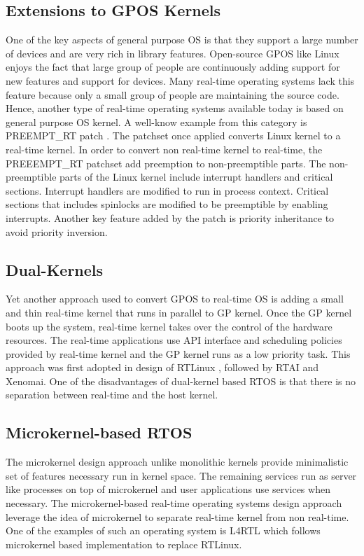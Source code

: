 \subsection{Extensions to GPOS Kernels} \label{sec:rtos-ext-gpos}
One of the key aspects of general purpose OS is that they support a large number of devices and are very rich in library features. 
Open-source GPOS like Linux enjoys the fact that large group of people are continuously adding support for new features and support for devices.
Many real-time operating systems lack this feature because only a small group of people are maintaining the source code. 
Hence, another type of real-time operating systems available today is based on general purpose OS kernel.
A well-know example from this category is PREEMPT\_RT patch \cite{PREEMPT-RT}. 
The patchset once applied converts Linux kernel to a real-time kernel.
In order to convert non real-time kernel to real-time, the PREEEMPT\_RT patchset add preemption to non-preemptible parts.
The non-preemptible parts of the Linux kernel include interrupt handlers and critical sections.
Interrupt handlers are modified to run in process context. 
Critical sections that includes spinlocks are modified to be preemptible by enabling interrupts.
Another key feature added by the patch is priority inheritance to avoid priority inversion.  

\subsection{Dual-Kernels}
Yet another approach used to convert GPOS to real-time OS is adding a small and thin real-time kernel that runs in parallel to GP kernel.
Once the GP kernel boots up the system, real-time kernel takes over the control of the hardware resources.
The real-time applications use API interface and scheduling policies provided by real-time kernel and the GP kernel runs as a low priority task.
This approach was first adopted in design of RTLinux \cite{yodaiken1999rtlinux}, followed by RTAI \cite{RTAI} and Xenomai\cite{Xenomai}. 
One of the disadvantages of dual-kernel based RTOS is that there is no separation between real-time and the host kernel.

\subsection{Microkernel-based RTOS}
The microkernel design approach unlike monolithic kernels provide minimalistic set of features necessary run in kernel space. 
The remaining services run as server like processes on top of microkernel and user applications use services when necessary.
The microkernel-based real-time operating systems design approach leverage the idea of microkernel to separate real-time kernel from non real-time.
One of the examples of such an operating system is L4RTL \cite{mehnert2001rtlinux} which follows microkernel based implementation to replace RTLinux.

